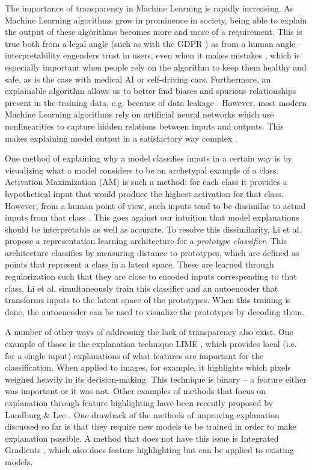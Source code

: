 The importance of transparency in Machine Learning is rapidly increasing. As Machine Learning algorithms grow in prominence in society, being able to explain the output of these algorithms becomes more and more of a requirement. This is true both from a legal angle (such as with the GDPR \citep{gdprart}) as from a human angle -- interpretability engenders trust in users, even when it makes mistakes \citep{automtrust}, which is especially important when people rely on the algorithm to keep them healthy and safe, as is the case with medical AI or self-driving cars. Furthermore, an explainable algorithm allows us to better find biases and spurious relationships present in the training data, e.g. because of data leakage \citep{dataleakage}. However, most modern Machine Learning algorithms rely on artificial neural networks which use nonlinearities to capture hidden relations between inputs and outputs. This makes explaining model output in a satisfactory way complex \citep{NNblackboxexplanation}.

One method of explaining why a model classifies inputs in a certain way is by visualizing what a model considers to be an archetypal example of a class. Activation Maximization (AM) \citep{activationmaximization} is such a method: for each class it provides a hypothetical input that would produce the highest activation for that class. However, from a human point of view, such inputs tend to be dissimilar to actual inputs from that class  \citep{activationmaximization}. This goes against our intuition that model explanations should be interpretable as well as accurate. To resolve this dissimilarity, Li et al. \citep{li2018deep} propose a representation learning architecture for a \textit{prototype classifier}. This architecture classifies by measuring distance to prototypes, which are defined as points that represent a class in a latent space. These are learned through regularization such that they are close to encoded inputs corresponding to that class. Li et al. simultaneously train this classifier and an autoencoder \citep{autoencoderpaper} that transforms inputs to the latent space of the prototypes. When this training is done, the autoencoder can be used to visualize the prototypes by decoding them.

A number of other ways of addressing the lack of transparency also exist. One example of those is the explanation technique LIME \citep{LIME}, which provides local (i.e. for a single input) explanations of what features are important for the classification. When applied to images, for example, it highlights which pixels weighed heavily in its decision-making. This technique is binary -- a feature either was important or it was not. Other examples of methods that focus on explanation through feature highlighting have been recently proposed by Lundburg \& Lee \citep{featureexamplepaper1}. One drawback of the methods of improving explanation discussed so far is that they require new models to be trained in order to make explanation possible. A method that does not have this issue is Integrated Gradients \citep{axioms}, which also does feature highlighting but can be applied to existing models.

